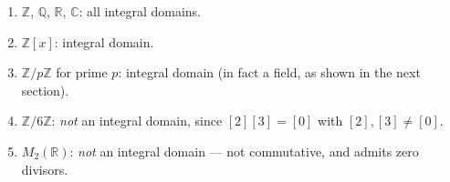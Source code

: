 \begin{remark*}
\end{remark*}


\begin{example}
\begin{enumerate}[label=(\roman*)]
  \item $\mathbb{Z}$, $\mathbb{Q}$, $\mathbb{R}$, $\mathbb{C}$:
        all integral domains.
  \item $\mathbb{Z}[x]$: integral domain.
  \item $\mathbb{Z}/p\mathbb{Z}$ for prime $p$: integral domain
        (in fact a field, as shown in the next section).
  \item $\mathbb{Z}/6\mathbb{Z}$: \emph{not} an integral domain,
        since $[2][3] = [0]$ with $[2],[3] \neq [0]$.
  \item $M_2(\mathbb{R})$: \emph{not} an integral domain ---
        not commutative, and admits zero divisors.
\end{enumerate}
\end{example}
